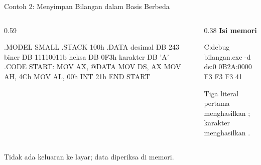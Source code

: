 \documentclass[aspectratio=169,11pt]{beamer}
\begin{document}
\begin{frame}[fragile]{Contoh 2: Menyimpan Bilangan dalam Basis Berbeda}
\begin{columns}[t]
\begin{column}{0.59\textwidth}
\begin{kodeasm}
.MODEL SMALL
.STACK 100h
.DATA
    desimal  DB 243
    biner    DB 11110011b
    heksa    DB 0F3h
    karakter DB 'A'
.CODE
START:
    MOV AX, @DATA
    MOV DS, AX
    MOV AH, 4Ch
    MOV AL, 00h
    INT 21h
END START
\end{kodeasm}
\end{column}
\begin{column}{0.38\textwidth}
{\color{obeTeal}\bfseries Isi memori}\\[0.3em]
\begin{keluaran}
C:\>debug bilangan.exe
-d ds:0
0B2A:0000  F3 F3 F3 41
\end{keluaran}

\vspace{0.4em}
{\footnotesize Tiga literal pertama menghasilkan ; karakter
 menghasilkan .\par}
\end{column}
\end{columns}

\vspace{0.15em}
{\footnotesize\color{obeGray}Tidak ada keluaran ke layar; data
diperiksa di memori.\par}
\end{frame}
\end{document}
